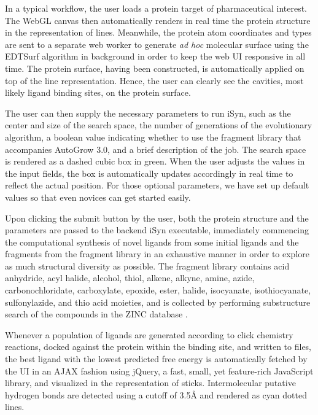 In a typical workflow, the user loads a protein target of pharmaceutical interest. The WebGL canvas then automatically renders in real time the protein structure in the representation of lines. Meanwhile, the protein atom coordinates and types are sent to a separate web worker to generate \textit{ad hoc} molecular surface using the EDTSurf algorithm \citep{1297,1350} in background in order to keep the web UI responsive in all time. The protein surface, having been constructed, is automatically applied on top of the line representation. Hence, the user can clearly see the cavities, most likely ligand binding sites, on the protein surface.

The user can then supply the necessary parameters to run iSyn, such as the center and size of the search space, the number of generations of the evolutionary algorithm, a boolean value indicating whether to use the fragment library that accompanies AutoGrow 3.0, and a brief description of the job. The search space is rendered as a dashed cubic box in green. When the user adjusts the values in the input fields, the box is automatically updates accordingly in real time to reflect the actual position. For those optional parameters, we have set up default values so that even novices can get started easily.

Upon clicking the submit button by the user, both the protein structure and the parameters are passed to the backend iSyn executable, immediately commencing the computational synthesis of novel ligands from some initial ligands and the fragments from the fragment library in an exhaustive manner in order to explore as much structural diversity as possible. The fragment library contains acid anhydride, acyl halide, alcohol, thiol, alkene, alkyne, amine, azide, carbonochloridate, carboxylate, epoxide, ester, halide, isocyanate, isothiocyanate, sulfonylazide, and thio acid moieties, and is collected by performing substructure search of the compounds in the ZINC database \citep{532,1178}.

Whenever a population of ligands are generated according to click chemistry reactions, docked against the protein within the binding site, and written to files, the best ligand with the lowest predicted free energy is automatically fetched by the UI in an AJAX fashion using jQuery, a fast, small, yet feature-rich JavaScript library, and visualized in the representation of sticks. Intermolecular putative hydrogen bonds are detected using a cutoff of 3.5Å and rendered as cyan dotted lines.

